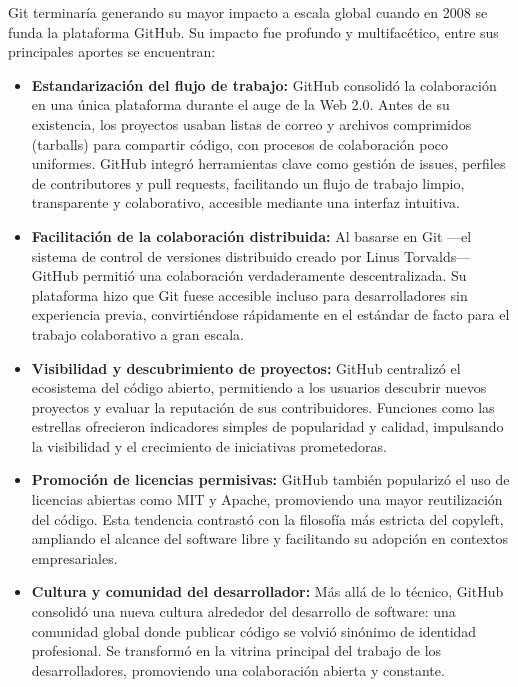 \documentclass[a4paper,12pt]{article}
\begin{document}
Git terminaría generando su mayor impacto a escala global cuando en 2008 se funda 
la plataforma GitHub. Su impacto fue profundo y multifacético, entre sus principales 
aportes se encuentran:

\begin{itemize}
    \item \textbf{Estandarización del flujo de trabajo:} GitHub consolidó la
    colaboración en una única plataforma durante el auge de la Web 2.0. Antes de
    su existencia, los proyectos usaban listas de correo y archivos comprimidos
    (tarballs) para compartir código, con procesos de colaboración poco
    uniformes. GitHub integró herramientas clave como gestión de issues,
    perfiles de contributores y pull requests, facilitando un flujo de trabajo
    limpio, transparente y colaborativo, accesible mediante una interfaz
    intuitiva.

    \item \textbf{Facilitación de la colaboración distribuida:} Al basarse en
    Git —el sistema de control de versiones distribuido creado por Linus
    Torvalds— GitHub permitió una colaboración verdaderamente descentralizada.
    Su plataforma hizo que Git fuese accesible incluso para desarrolladores sin
    experiencia previa, convirtiéndose rápidamente en el estándar de facto para
    el trabajo colaborativo a gran escala.

    \item \textbf{Visibilidad y descubrimiento de proyectos:} GitHub centralizó
    el ecosistema del código abierto, permitiendo a los usuarios descubrir
    nuevos proyectos y evaluar la reputación de sus contribuidores. Funciones
    como las estrellas ofrecieron indicadores simples de popularidad y calidad,
    impulsando la visibilidad y el crecimiento de iniciativas prometedoras.

    \item \textbf{Promoción de licencias permisivas:} GitHub también popularizó
    el uso de licencias abiertas como MIT y Apache, promoviendo una mayor
    reutilización del código. Esta tendencia contrastó con la filosofía más
    estricta del copyleft, ampliando el alcance del software libre y facilitando
    su adopción en contextos empresariales.

    \item \textbf{Cultura y comunidad del desarrollador:} Más allá de lo
    técnico, GitHub consolidó una nueva cultura alrededor del desarrollo de
    software: una comunidad global donde publicar código se volvió sinónimo de
    identidad profesional. Se transformó en la vitrina principal del trabajo de
    los desarrolladores, promoviendo una colaboración abierta y constante.
\end{itemize}
\end{document}
